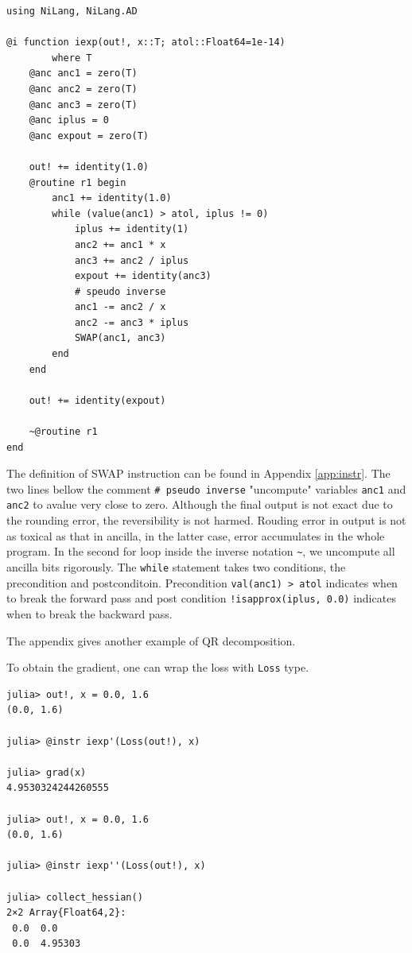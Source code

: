 \documentclass[aps,twocolumn,longbibliography,english,superscriptaddress,prr]{revtex4-1}
\newcommand{\<}{\langle}
\renewcommand{\>}{\rangle}
\newcommand{\App}[1]{Appendix \ref{#1}}
\theoremstyle{definition}\newtheorem{definition}{\textit{Definition}}
\begin{document}
\begin{minipage}{.44\textwidth}
\begin{lstlisting}
using NiLang, NiLang.AD

@i function iexp(out!, x::T; atol::Float64=1e-14)
        where T
    @anc anc1 = zero(T)
    @anc anc2 = zero(T)
    @anc anc3 = zero(T)
    @anc iplus = 0
    @anc expout = zero(T)

    out! += identity(1.0)
    @routine r1 begin
        anc1 += identity(1.0)
        while (value(anc1) > atol, iplus != 0)
            iplus += identity(1)
            anc2 += anc1 * x
            anc3 += anc2 / iplus
            expout += identity(anc3)
            # speudo inverse
            anc1 -= anc2 / x
            anc2 -= anc3 * iplus
            SWAP(anc1, anc3)
        end
    end

    out! += identity(expout)

    ~@routine r1
end
\end{lstlisting}
\end{minipage}

The definition of SWAP instruction can be found in \App{app:instr}.
The two lines bellow the comment \texttt{\# pseudo inverse} "uncompute" variables \texttt{anc1} and \texttt{anc2} to avalue very close to zero.
Although the final output is not exact due to the rounding error, the reversibility is not harmed.
Rouding error in output is not as toxical as that in ancilla, in the latter case, error accumulates in the whole program.
In the second for loop inside the inverse notation \texttt{\~}, we uncompute all ancilla bits rigorously.
The \texttt{while} statement takes two conditions, the precondition and postconditoin. Precondition \texttt{val(anc1) > atol} indicates when to break the forward pass and post condition \texttt{!isapprox(iplus, 0.0)} indicates when to break the backward pass.

The appendix gives another example of QR decomposition.

To obtain the gradient, one can wrap the loss with \texttt{Loss} type.

\begin{minipage}{.44\textwidth}
\begin{lstlisting}
julia> out!, x = 0.0, 1.6
(0.0, 1.6)

julia> @instr iexp'(Loss(out!), x)

julia> grad(x)
4.9530324244260555

julia> out!, x = 0.0, 1.6
(0.0, 1.6)

julia> @instr iexp''(Loss(out!), x)

julia> collect_hessian()
2×2 Array{Float64,2}:
 0.0  0.0
 0.0  4.95303
\end{lstlisting}
\end{minipage}
\end{document}
